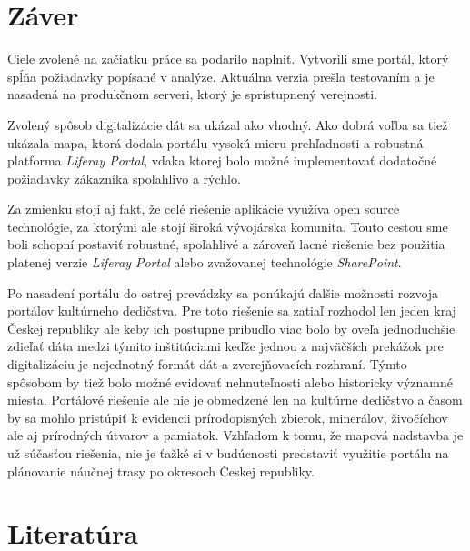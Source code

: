 \documentclass[
  print, %
  table,   %
  lof,     %
  nolot,     %
]{fithesis3}
\begin{document}
\chapter{Záver}
Ciele zvolené na začiatku práce sa podarilo naplniť. Vytvorili sme portál, ktorý spĺňa požiadavky popísané v analýze. Aktuálna verzia prešla testovaním a je nasadená na produkčnom serveri, ktorý je sprístupnený verejnosti.

Zvolený spôsob digitalizácie dát sa ukázal ako vhodný. Ako dobrá voľba sa tiež ukázala mapa, ktorá dodala portálu vysokú mieru prehľadnosti a robustná platforma \textit{Liferay Portal}, vďaka ktorej bolo možné implementovať dodatočné požiadavky zákazníka spoľahlivo a rýchlo.

Za zmienku stojí aj fakt, že celé riešenie aplikácie využíva open source technológie, za ktorými ale stojí široká vývojárska komunita. Touto cestou sme boli schopní postaviť robustné, spoľahlivé a zároveň lacné riešenie bez použitia platenej verzie \textit{Liferay Portal} alebo zvažovanej technológie \textit{SharePoint}.

Po nasadení portálu do ostrej prevádzky sa ponúkajú ďalšie možnosti rozvoja portálov kultúrneho dedičstva. Pre toto riešenie sa zatiaľ rozhodol len jeden kraj Českej republiky ale keby ich postupne pribudlo viac bolo by oveľa jednoduchšie zdieľať dáta medzi týmito inštitúciami keďže jednou z najväčších prekážok pre digitalizáciu je nejednotný formát dát a zverejňovacích rozhraní. Týmto spôsobom by tiež bolo možné evidovať nehnuteľnosti alebo historicky významné miesta. Portálové riešenie ale nie je obmedzené len na kultúrne dedičstvo a časom by sa mohlo pristúpiť k evidencii prírodopisných zbierok, minerálov, živočíchov ale aj prírodných útvarov a pamiatok. Vzhľadom k tomu, že mapová nadstavba je už súčasťou riešenia, nie je ťažké si v budúcnosti predstaviť využitie portálu na plánovanie náučnej trasy po okresoch Českej republiky.  
\chapter*{Literatúra}
\printbibliography[heading=none] %
\end{document}

